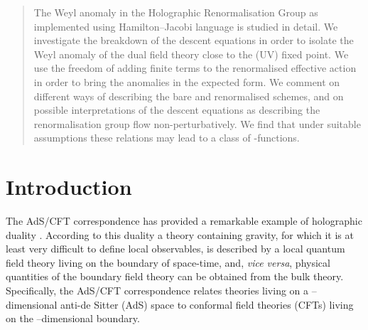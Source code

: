\documentclass[a4paper,12pt]{article}
\begin{document}
\begin{titlepage}
\begin{abstract}
\noindent
The Weyl anomaly in the Holographic Renormalisation Group 
as implemented using Hamilton--Jacobi language is studied in detail.  
We investigate the breakdown of the descent equations in order to isolate   
the Weyl anomaly of the dual field theory close to the (UV) fixed point. 
We use the freedom of adding finite terms to the renormalised effective
action in order to bring the anomalies in the expected form.
We comment on different ways of describing the 
bare and renormalised schemes, and on possible interpretations of the descent
equations as describing the renormalisation group flow non-perturbatively.
We find that under suitable assumptions these relations may lead to a class of 
\coordHE{}-functions.
\end{abstract}

\end{titlepage}

\section{Introduction}
\label{intro}
The AdS/CFT correspondence \cite{Maldacena98,Witten98-1,Gubser98-1} 
has provided a remarkable example of holographic duality
\cite{'tHooft93,Susskind95}. According to this duality a theory 
containing gravity, for which it is at least very 
difficult to define local
observables, is described by a local quantum field theory
living on the boundary of space-time, and, \emph{vice versa}, physical
quantities of the boundary field theory can be obtained from the
bulk theory. Specifically, the AdS/CFT correspondence relates 
theories living on a \coordHE{}--dimensional anti-de Sitter (AdS) space to
conformal field theories (CFTs) living on the \coordHE{}--dimensional boundary.
\end{document}
